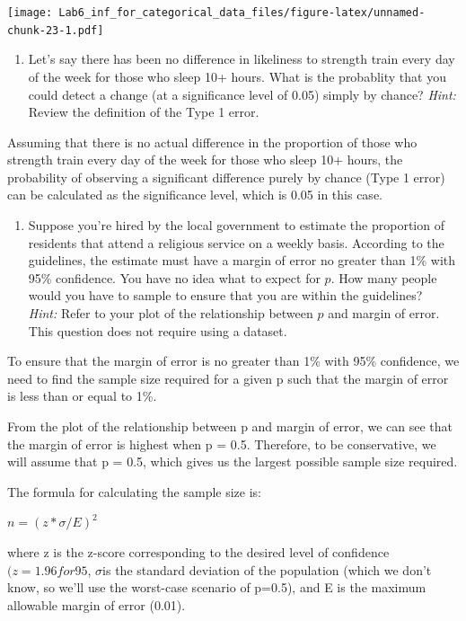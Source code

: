 \documentclass[
]{article}
\providecommand{\tightlist}{%
  \setlength{\itemsep}{0pt}\setlength{\parskip}{0pt}}
\begin{document}
\texttt{[image: Lab6\_inf\_for\_categorical\_data\_files/figure-latex/unnamed-chunk-23-1.pdf]}

\begin{enumerate}
\def\labelenumi{\arabic{enumi}.}
\setcounter{enumi}{9}
\tightlist
\item
  Let's say there has been no difference in likeliness to strength train
  every day of the week for those who sleep 10+ hours. What is the
  probablity that you could detect a change (at a significance level of
  0.05) simply by chance? \emph{Hint:} Review the definition of the Type
  1 error.
\end{enumerate}

Assuming that there is no actual difference in the proportion of those
who strength train every day of the week for those who sleep 10+ hours,
the probability of observing a significant difference purely by chance
(Type 1 error) can be calculated as the significance level, which is
0.05 in this case.

\begin{enumerate}
\def\labelenumi{\arabic{enumi}.}
\setcounter{enumi}{10}
\tightlist
\item
  Suppose you're hired by the local government to estimate the
  proportion of residents that attend a religious service on a weekly
  basis. According to the guidelines, the estimate must have a margin of
  error no greater than 1\% with 95\% confidence. You have no idea what
  to expect for \(p\). How many people would you have to sample to
  ensure that you are within the guidelines?\\
  \emph{Hint:} Refer to your plot of the relationship between \(p\) and
  margin of error. This question does not require using a dataset.
\end{enumerate}

To ensure that the margin of error is no greater than 1\% with 95\%
confidence, we need to find the sample size required for a given p such
that the margin of error is less than or equal to 1\%.

From the plot of the relationship between p and margin of error, we can
see that the margin of error is highest when p = 0.5. Therefore, to be
conservative, we will assume that p = 0.5, which gives us the largest
possible sample size required.

The formula for calculating the sample size is:

\(n = (z*σ / E)^2\)

where z is the z-score corresponding to the desired level of confidence
\((z = 1.96 for 95%
\), \(σ\)is the standard deviation of the population (which we don't
know, so we'll use the worst-case scenario of p=0.5), and E is the
maximum allowable margin of error (0.01).
\end{document}

